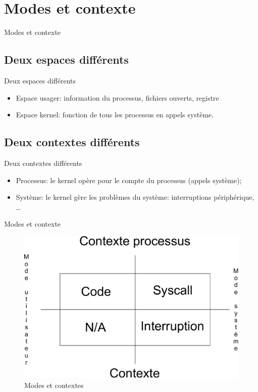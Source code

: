 \def\sectitle{Modes et contexte}
\section{\sectitle}

\begin{frame}{\sectitle}
\def\subsectitle{Deux espaces différents}
\subsection{\subsectitle}

\begin{block}{\subsectitle}
\begin{itemize}
    \item Espace usager: information du processus, fichiers ouverts, registre
    \item Espace kernel: fonction de tous les processus en appels système.
\end{itemize}
\end{block}


\def\subsectitle{Deux contextes différents}
\subsection{\subsectitle}

\begin{block}{\subsectitle}
\begin{itemize}
    \item Processus: le kernel opère pour le compte du processus (appels
    système);
    \item Système: le kernel gère les problèmes du système: interruptions
    périphérique, \dots
\end{itemize}
\end{block}
\end{frame}

\begin{frame}{\sectitle}
\begin{figure}
\includegraphics[width=.9\textwidth]{images/ContextMode.pdf}
\caption{Modes et contextes}
\end{figure}
\end{frame}

